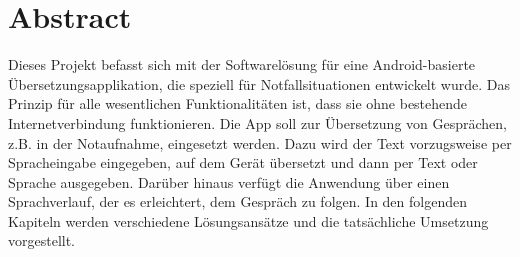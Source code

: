 \newpage
\section*{Abstract}\label{sec:abstract}

Dieses Projekt befasst sich mit der Softwarelösung für eine Android-basierte Übersetzungsapplikation, die speziell für Notfallsituationen entwickelt wurde. Das Prinzip für alle wesentlichen Funktionalitäten ist, dass sie ohne bestehende Internetverbindung funktionieren. Die App soll zur Übersetzung von Gesprächen, z.B. in der Notaufnahme, eingesetzt werden. Dazu wird der Text vorzugsweise per Spracheingabe eingegeben, auf dem Gerät übersetzt und dann per Text oder Sprache ausgegeben. Darüber hinaus verfügt die Anwendung über einen Sprachverlauf, der es erleichtert, dem Gespräch zu folgen. In den folgenden Kapiteln werden verschiedene Lösungsansätze und die tatsächliche Umsetzung vorgestellt.